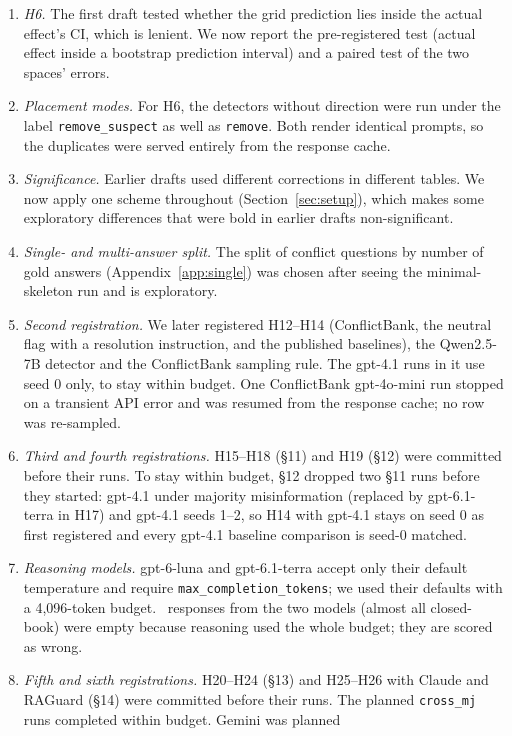 \begin{enumerate}[leftmargin=*,itemsep=1pt,topsep=2pt]
\item \emph{H6.} The first draft tested whether the grid prediction lies inside the actual effect's CI, which is
lenient. We now report the pre-registered test (actual effect inside a bootstrap prediction interval) and a paired test
of the two spaces' errors.
\item \emph{Placement modes.} For H6, the detectors without direction were run under the label
\texttt{remove\_suspect} as well as \texttt{remove}. Both render identical prompts, so the duplicates were served entirely from
the response cache.
\item \emph{Significance.} Earlier drafts used different corrections in different tables. We now apply one scheme
throughout (Section~\ref{sec:setup}), which makes some exploratory differences that were bold in earlier drafts
non-significant.
\item \emph{Single- and multi-answer split.} The split of conflict questions by number of gold answers
(Appendix~\ref{app:single}) was chosen after seeing the minimal-skeleton run and is exploratory.
\item \emph{Second registration.} We later registered H12--H14 (ConflictBank, the neutral flag with a
resolution instruction, and the published baselines), the Qwen2.5-7B detector and the ConflictBank sampling rule.
The gpt-4.1 runs in it use seed 0 only, to stay within budget. One ConflictBank gpt-4o-mini run stopped on a
transient API error and was resumed from the response cache; no row was re-sampled.
\item \emph{Third and fourth registrations.} H15--H18 (\S11) and H19 (\S12) were committed before their runs. To stay
within budget, \S12 dropped two \S11 runs before they started: gpt-4.1 under majority misinformation (replaced by
gpt-6.1-terra in H17) and gpt-4.1 seeds 1--2, so H14 with gpt-4.1 stays on seed 0 as first registered and every
gpt-4.1 baseline comparison is seed-0 matched.
\item \emph{Reasoning models.} gpt-6-luna and gpt-6.1-terra accept only their default temperature and require
\texttt{max\_completion\_tokens}; we used their defaults with a 4,096-token budget. \Nempty\ responses from the
two models (almost all closed-book) were empty because reasoning used the whole budget; they are scored as wrong.
\item \emph{Fifth and sixth registrations.} H20--H24 (\S13) and H25--H26 with Claude and RAGuard (\S14) were
committed before their runs. The planned \texttt{cross\_mj} runs completed within budget. Gemini was planned

\end{enumerate}
